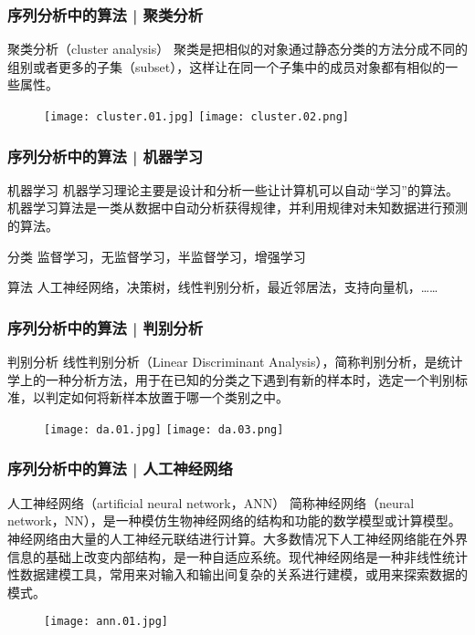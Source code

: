 \begin{frame}
  \frametitle{序列分析中的算法 | 聚类分析}
  \begin{block}{聚类分析（cluster analysis）}
    聚类是把相似的对象通过静态分类的方法分成不同的组别或者更多的子集（subset），这样让在同一个子集中的成员对象都有相似的一些属性。
  \end{block}
  \begin{figure}
    \centering
    \texttt{[image: cluster.01.jpg]}
    \texttt{[image: cluster.02.png]}
  \end{figure}
\end{frame}

\begin{frame}
  \frametitle{序列分析中的算法 | 机器学习}
  \begin{block}{机器学习}
    机器学习理论主要是设计和分析一些让计算机可以自动“学习”的算法。机器学习算法是一类从数据中自动分析获得规律，并利用规律对未知数据进行预测的算法。
  \end{block}
  \pause
  \begin{block}{分类}
    监督学习，无监督学习，半监督学习，增强学习
  \end{block}
  \pause
  \begin{block}{算法}
    人工神经网络，决策树，线性判别分析，最近邻居法，支持向量机，……
  \end{block}
\end{frame}

\begin{frame}
  \frametitle{序列分析中的算法 | 判别分析}
  \begin{block}{判别分析}
    线性判别分析（Linear Discriminant Analysis），简称判别分析，是统计学上的一种分析方法，用于在已知的分类之下遇到有新的样本时，选定一个判别标准，以判定如何将新样本放置于哪一个类别之中。
  \end{block}
  \begin{figure}
    \centering
    \texttt{[image: da.01.jpg]}
    \texttt{[image: da.03.png]}
  \end{figure}
\end{frame}

\begin{frame}
  \frametitle{序列分析中的算法 | 人工神经网络}
  \begin{block}{人工神经网络（artificial neural network，ANN）}
   简称神经网络（neural network，NN），是一种模仿生物神经网络的结构和功能的数学模型或计算模型。神经网络由大量的人工神经元联结进行计算。大多数情况下人工神经网络能在外界信息的基础上改变内部结构，是一种自适应系统。现代神经网络是一种非线性统计性数据建模工具，常用来对输入和输出间复杂的关系进行建模，或用来探索数据的模式。
  \end{block}
  \begin{figure}
    \centering
    \texttt{[image: ann.01.jpg]}
  \end{figure}
\end{frame}


